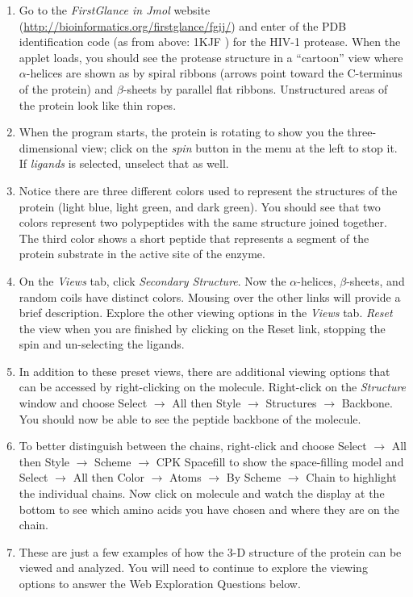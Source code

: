 \begin{enumerate}

 \item  Go to the \emph{FirstGlance in Jmol} website (\url{http://bioinformatics.org/firstglance/fgij/}) and enter of the PDB identification code (as from above: \color{blue} 1KJF \color{black}) for the HIV-1 protease.  When the applet loads, you should see the protease structure in a ``cartoon'' view where $\alpha$-helices are shown as by spiral ribbons (arrows point toward the C-terminus of the protein) and $\beta$-sheets by parallel flat ribbons.  Unstructured areas of the protein look like thin ropes.

 \item  When the program starts, the protein is rotating to show you the three-dimensional view; click on the \emph{spin} button in the menu at the left to stop it. If \emph{ligands} is selected, unselect that as well.

 \item  Notice there are three different colors used to represent the structures of the protein (light blue, light green, and dark green). You should see that two colors represent two polypeptides with the same structure joined together.  The third color shows a short peptide that represents a segment of the protein substrate in the active site of the enzyme.

 \item  On the \emph{Views} tab, click \emph{Secondary Structure}. Now the $\alpha$-helices, $\beta$-sheets, and random coils have distinct colors. Mousing over the other links will provide a brief description. Explore the other viewing options in the \emph{Views} tab. \emph{Reset} the view when you are finished by clicking on the Reset link, stopping the spin and un-selecting the ligands.

 \item  In addition to these preset views, there are additional viewing options that can be accessed by right-clicking on the molecule. Right-click on the \emph{Structure} window and choose Select $\to$ All then Style $\to$ Structures $\to$ Backbone. You should now be able to see the peptide backbone of the molecule. 

 \item  To better distinguish between the chains, right-click and choose Select $\to$ All then Style $\to$ Scheme $\to$ CPK Spacefill to show the space-filling model and Select $\to$ All then Color $\to$ Atoms $\to$ By Scheme $\to$ Chain to highlight the individual chains. Now click on molecule and watch the display at the bottom to see which amino acids you have chosen and where they are on the chain.

 \item  These are just a few examples of how the 3-D structure of the protein can be viewed and analyzed. You will need to continue to explore the viewing options to answer the Web Exploration Questions below.

\end{enumerate}



